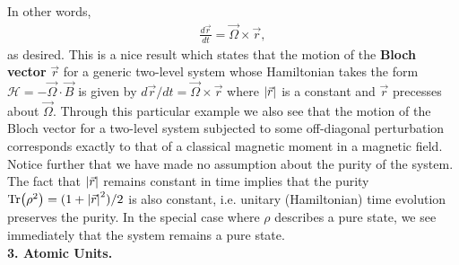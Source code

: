\documentclass{article}
\theoremstyle{definition}
\newcommand{\ham}{\mathcal{H}}
\newcommand{\f}[2]{\frac{#1}{#2}}
\begin{document}
In other words, 
\begin{align*}
\f{d\vec{r}}{dt} = \vec{\Omega} \times \vec{r},
\end{align*}
as desired. This is a nice result which states that the motion of the \textbf{Bloch vector} $\vec{r}$ for a generic two-level system whose Hamiltonian takes the form $\ham = - \vec{\Omega} \cdot \vec{B}$ is given by $d\vec{r}/dt = \vec{\Omega}\times \vec{r}$ where $\abs{\vec{r}}$ is a constant and $\vec{r}$ precesses about $\vec{\Omega}$. Through this particular example we also see that the motion of the Bloch vector for a two-level system subjected to some off-diagonal perturbation corresponds exactly to that of a classical magnetic moment in a magnetic field. \\


Notice further that we have made no assumption about the purity of the system. The fact that $\abs{\vec{r}}$ remains constant in time implies that the purity $\Tr(\rho^2) = (1 + \abs{\vec{r}}^2)/2$ is also constant, i.e. unitary (Hamiltonian) time evolution preserves the purity. In the special case where $\rho$ describes a pure state, we see immediately that the system remains a pure state. \\













\noindent \textbf{3. Atomic Units.}
\end{document}
